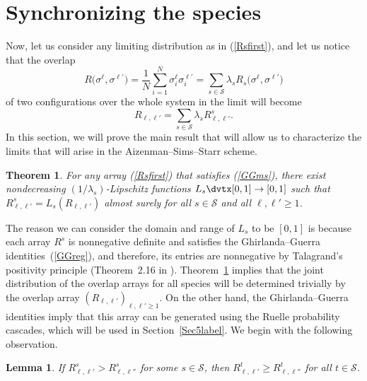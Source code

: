 \documentclass[aop,MSNbibl,dvips]{arximspdf}
\def\cal{\mathscr}
\newcommand{\spe}{{\cal S}}
\newtheorem{lemma}{Lemma}
\newtheorem{theorem}{Theorem}
\begin{document}
\section{Synchronizing the species}\label{Sec4label}

Now, let us consider any limiting distribution as in (\ref{Rsfirst}),
and let us notice that the overlap
%
\[
R\bigl(\sigma^\ell,\sigma^{\ell'}\bigr) = \frac{1}{N}
\sum_{i=1}^N \sigma ^\ell_i
\sigma^{\ell'}_i = \sum_{s\in\spe}
\lambda_s R_s\bigl( \sigma^\ell,
\sigma^{\ell'}\bigr)
\]
%
of two configurations over the whole system in the limit will become
%
\begin{equation}
R_{\ell,\ell'} = \sum_{s\in\spe} \lambda_s
R^s_{\ell,\ell'}. \label{Aoverlap}
\end{equation}
%
In this section, we will prove the main result that will allow us to
characterize the limits that will arise in the Aizenman--Sims--Starr scheme.

\begin{theorem}\label{ThSynch}
For any array (\ref{Rsfirst}) that satisfies (\ref{GGms}), there exist
nondecreasing $(1/\lambda_s)$-Lipschitz functions $L_s\dvtx [0,1]\to
[0,1]$ such that $R^s_{\ell,\ell'} = L_s(R_{\ell,\ell'})$ almost surely
for all $s\in\spe$ and all $\ell,\ell'\geq1$.
\end{theorem}
%

The reason we can consider the domain and range of $L_s$ to be $[0,1]$
is because each array $R^s$ is nonnegative definite and satisfies the
Ghirlanda--Guerra identities~(\ref{GGreg}), and therefore, its entries
are nonnegative by Talagrand's positivity principle (Theorem~2.16 in
\cite{SKmodel}). Theorem~\ref{ThSynch} implies that the joint
distribution of the overlap arrays for all species will be determined
trivially by the overlap array $(R_{\ell,\ell'})_{\ell,\ell'\geq1}$.
On the other hand, the Ghirlanda--Guerra identities imply that this
array can be generated using the Ruelle probability cascades, which
will be used in Section~\ref{Sec5label}. We begin with the following
observation.

\begin{lemma}\label{LemSynch}
If $R^s_{\ell,\ell'}> R^s_{\ell,\ell''}$ for some $s\in\spe$, then
$R^t_{\ell,\ell'}\geq R^t_{\ell,\ell''}$ for all $t\in\spe$.
\end{lemma}
\end{document}

